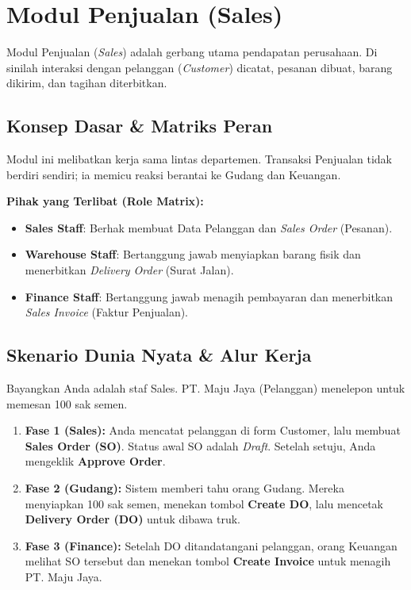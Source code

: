 \chapter{Modul Penjualan (Sales)}

Modul Penjualan (\textit{Sales}) adalah gerbang utama pendapatan perusahaan. Di sinilah interaksi dengan pelanggan (\textit{Customer}) dicatat, pesanan dibuat, barang dikirim, dan tagihan diterbitkan.

\section{Konsep Dasar \& Matriks Peran}
Modul ini melibatkan kerja sama lintas departemen. Transaksi Penjualan tidak berdiri sendiri; ia memicu reaksi berantai ke Gudang dan Keuangan.

\textbf{Pihak yang Terlibat (Role Matrix):}
\begin{itemize}
    \item \textbf{Sales Staff}: Berhak membuat Data Pelanggan dan \textit{Sales Order} (Pesanan).
    \item \textbf{Warehouse Staff}: Bertanggung jawab menyiapkan barang fisik dan menerbitkan \textit{Delivery Order} (Surat Jalan).
    \item \textbf{Finance Staff}: Bertanggung jawab menagih pembayaran dan menerbitkan \textit{Sales Invoice} (Faktur Penjualan).
\end{itemize}

\section{Skenario Dunia Nyata \& Alur Kerja}
Bayangkan Anda adalah staf Sales. PT. Maju Jaya (Pelanggan) menelepon untuk memesan 100 sak semen.
\begin{enumerate}
    \item \textbf{Fase 1 (Sales):} Anda mencatat pelanggan di form Customer, lalu membuat \textbf{Sales Order (SO)}. Status awal SO adalah \textit{Draft}. Setelah setuju, Anda mengeklik \textbf{Approve Order}.
    \item \textbf{Fase 2 (Gudang):} Sistem memberi tahu orang Gudang. Mereka menyiapkan 100 sak semen, menekan tombol \textbf{Create DO}, lalu mencetak \textbf{Delivery Order (DO)} untuk dibawa truk.
    \item \textbf{Fase 3 (Finance):} Setelah DO ditandatangani pelanggan, orang Keuangan melihat SO tersebut dan menekan tombol \textbf{Create Invoice} untuk menagih PT. Maju Jaya.
\end{enumerate}

